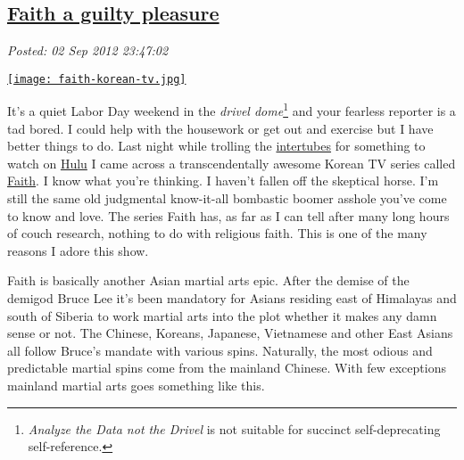 %

\subsection*{\href{https://bakerjd99.wordpress.com/2012/09/02/faith-a-guilty-pleasure/}{Faith a guilty pleasure}}


\noindent\emph{Posted: 02 Sep 2012 23:47:02}
\vspace{6pt}


\captionsetup[floatingfigure]{labelformat=empty}
\begin{floatingfigure}[l]{0.25\textwidth}
\centering
\href{http://www.squidoo.com/faith-korean-drama}{\texttt{[image: faith-korean-tv.jpg]}}
\label{fig:3163X0}
\end{floatingfigure}It's
a quiet Labor Day weekend in the \emph{drivel dome}\footnote{
\emph{Analyze the Data not the Drivel} is not
suitable for succinct self-deprecating self-reference.
}
and your fearless reporter is a tad bored. I could help with the
housework or get out and exercise but I have better things to do. Last
night while trolling the
\href{http://www.urbandictionary.com/define.php?term=intertubes}{intertubes}
for something to watch on \href{http://www.hulu.com/}{Hulu} I came
across a transcendentally awesome Korean TV series called
\href{http://www.hulu.com/search?q=faith}{Faith}. I know what you're
thinking. I haven't fallen off the skeptical horse. I'm still the same
old judgmental know-it-all bombastic boomer asshole you've come to know
and love. The series Faith has, as far as I can tell after many long
hours of couch research, nothing to do with religious faith. This is one
of the many reasons I adore this show.

Faith is basically another Asian martial arts epic. After the demise of
the demigod Bruce Lee it's been mandatory for Asians residing east of
Himalayas and south of Siberia to work martial arts into the plot
whether it makes any damn sense or not. The Chinese, Koreans, Japanese,
Vietnamese and other East Asians all follow Bruce's mandate with various
spins. Naturally, the most odious and predictable martial spins come
from the mainland Chinese. With few exceptions mainland martial arts
goes something like this.

